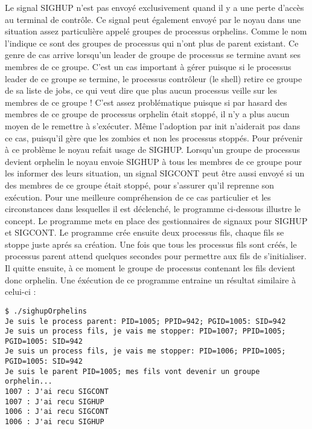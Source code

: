 Le signal SIGHUP n’est pas envoyé exclusivement quand il y a une perte d’accès au terminal de contrôle. Ce signal peut également envoyé par le noyau dans une situation assez particulière appelé groupes 
de processus orphelins. Comme le nom l’indique ce sont des groupes de processus qui n’ont plus de parent existant. Ce genre de cas arrive lorsqu’un leader de groupe de processus se termine avant ses membres de 
ce groupe. 
\newline
C’est un cas important à gérer puisque si le processus leader de ce groupe se termine, le processus contrôleur (le shell) retire ce groupe de sa liste de jobs, ce qui veut dire que plus aucun processus veille 
sur les membres de ce groupe ! C’est assez problématique puisque si par hasard des membres de ce groupe de processus orphelin était stoppé, il n’y a plus aucun moyen de le remettre à s’exécuter. Même l’adoption par 
init n’aiderait pas dans ce cas, puisqu’il gère que les zombies et non les processus stoppés.
\newline
Pour prévenir à ce problème le noyau refait usage de SIGHUP. Lorsqu’un groupe de processus devient orphelin le noyau envoie SIGHUP à tous les membres de ce groupe pour les informer des leurs situation, un signal 
SIGCONT peut être aussi envoyé si un des membres de ce groupe était stoppé, pour s’assurer qu’il reprenne son exécution. 
\newline
\newline
Pour une meilleure compréhension de ce cas particulier et les circonstances dans lesquelles il est déclenché, le programme ci-dessous illustre le concept.
Le programme mets en place des gestionnaires de signaux pour SIGHUP et SIGCONT. Le programme crée ensuite deux processus fils, chaque fils se stoppe juste aprés sa création.
\newline
Une fois que tous les processus fils sont créés, le processus parent attend quelques secondes pour permettre aux fils de s'initialiser. Il quitte ensuite, à ce moment le groupe de processus contenant les fils devient donc orphelin. 
\newline
Une éxécution de ce programme entraine un résultat similaire à celui-ci :
\begin{lstlisting}
$ ./sighupOrphelins
Je suis le process parent: PID=1005; PPID=942; PGID=1005: SID=942
Je suis un process fils, je vais me stopper: PID=1007; PPID=1005; PGID=1005: SID=942
Je suis un process fils, je vais me stopper: PID=1006; PPID=1005; PGID=1005: SID=942
Je suis le parent PID=1005; mes fils vont devenir un groupe orphelin...
1007 : J'ai recu SIGCONT
1007 : J'ai recu SIGHUP
1006 : J'ai recu SIGCONT
1006 : J'ai recu SIGHUP
\end{lstlisting}


